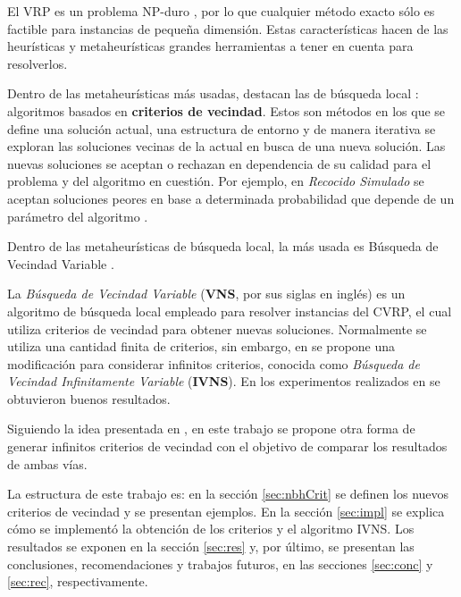 \documentclass[a4paper,10pt,twocolumn]{article}
\begin{document}
	El VRP es un problema NP-duro \cite{Paolo}, por lo que cualquier método exacto sólo es
	factible para instancias de pequeña dimensión. Estas características hacen de las 
	heurísticas y metaheurísticas grandes herramientas a tener en cuenta para resolverlos.

	Dentro de las metaheurísticas más usadas, destacan las de búsqueda local 
	\cite{Anand, Bianchi}: algoritmos basados en \textbf{criterios de vecindad}. Estos son 
	métodos en los que se define una solución actual, una estructura de entorno y de manera 
	iterativa se exploran las soluciones vecinas de la actual en busca de una nueva 
	solución. Las nuevas soluciones se aceptan o rechazan en dependencia de su calidad 
	para el problema y del algoritmo en cuestión. Por ejemplo, en \textit{Recocido Simulado} 
	se aceptan soluciones peores en base a determinada probabilidad que depende de un 
	parámetro del algoritmo \cite{Alina}.

	Dentro de las metaheurísticas de búsqueda local, la más usada es Búsqueda de Vecindad 
	Variable \cite{Mla}.
	
	La \textit{Búsqueda de Vecindad Variable} (\textbf{VNS}, por sus siglas en inglés) es un
	algoritmo de búsqueda local empleado para resolver instancias del CVRP, el cual utiliza 
	criterios de vecindad para obtener nuevas soluciones. Normalmente se utiliza una cantidad
	finita de criterios, sin embargo, en \cite{Camila} se propone una mo\-di\-fi\-ca\-ción 
	para considerar infinitos criterios, conocida como 
	\textit{Búsqueda de Vecindad Infinitamente Variable} (\textbf{IVNS}). En los experimentos 
	realizados en \cite{Camila} se obtuvieron buenos resultados. 
	
	Siguiendo la idea presentada en \cite{Camila}, en este trabajo se propone otra forma de 
	generar infinitos criterios de vecindad con el objetivo de comparar los resultados de 
	ambas vías.

	La estructura de este trabajo es: en la sección \ref{sec:nbhCrit} se definen los nuevos 
	criterios de vecindad y se presentan ejemplos. En la sección \ref{sec:impl} se explica 
	cómo se implementó la obtención de los criterios y el algoritmo IVNS. Los resultados se 
	exponen en la sección \ref{sec:res} y, por último, se presentan las conclusiones, 
	recomendaciones y trabajos futuros, en las secciones \ref{sec:conc} y \ref{sec:rec},
	respectivamente.

\end{document}
